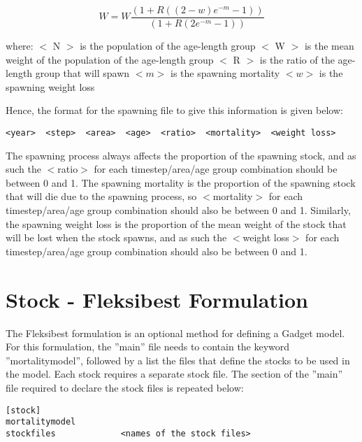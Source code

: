 \documentclass [a4paper, 10pt]{book}
\begin{document}
\begin{equation}\label{eq:spawn2}
W = W \frac{\left(1 + R {((2 - w)e^{-m} - 1)}\right)}{\left(1 + R {(2e^{-m} - 1)}\right)}
\end{equation}

where:\newline
$<$ N $>$ is the population of the age-length group\newline
$<$ W $>$ is the mean weight of the population of the age-length group\newline
$<$ R $>$ is the ratio of the age-length group that will spawn\newline
$<m>$ is the spawning mortality\newline
$<w>$ is the spawning weight loss

\bigskip
Hence, the format for the spawning file to give this information is given below:

{\small\begin{verbatim}
<year>  <step>  <area>  <age>  <ratio>  <mortality>  <weight loss>
\end{verbatim}}

The spawning process always affects the proportion of the spawning stock, and as such the $<$ratio$>$ for each timestep/area/age group combination should be between 0 and 1.  The spawning mortality is the proportion of the spawning stock that will die due to the spawning process, so $<$mortality$>$ for each timestep/area/age group combination should also be between 0 and 1.  Similarly, the spawning weight loss is the proportion of the mean weight of the stock that will be lost when the stock spawns, and as such the $<$weight loss$>$ for each timestep/area/age group combination should also be between 0 and 1.

\section{Stock - Fleksibest Formulation}\label{sec:fleksistock}
The Fleksibest formulation is an optional method for defining a Gadget model.  For this formulation, the ''main'' file needs to contain the keyword ''mortalitymodel'', followed by a list the files that define the stocks to be used in the model.  Each stock requires a separate stock file.  The section of the ''main'' file required to declare the stock files is repeated below:

{\small\begin{verbatim}
[stock]
mortalitymodel
stockfiles             <names of the stock files>
\end{verbatim}}
\end{document}
